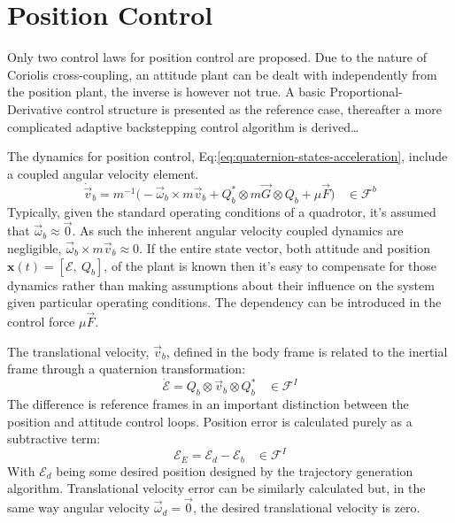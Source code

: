 {\section{Position Control}
\label{sec:control.position}
Only two control laws for position control are proposed. Due to the nature of Coriolis cross-coupling, an attitude plant can be dealt with independently from the position plant, the inverse is however not true. A basic Proportional-Derivative control structure is presented as the reference case, thereafter a more complicated adaptive backstepping control algorithm is derived\ldots
\par
The dynamics for position control, Eq:\ref{eq:quaternion-states-acceleration}, include a coupled angular velocity element.
\begin{equation}\label{eq:position-deriv}
\dot{\vec{v}}_b=m^{-1}\big(-\vec{\omega}_b\times m\vec{v}_b+Q_b^*\otimes m\vec{G}\otimes Q_b+\mu\vec{F}\big)~~~~\in\mathcal{F}^b
\end{equation}
Typically, given the standard operating conditions of a quadrotor, it's assumed that $\vec{\omega}_b\approx\vec{0}$. As such the inherent angular velocity coupled dynamics are negligible, $\vec{\omega}_b\times m\vec{v}_b\approx 0$. If the entire state vector, both attitude and position $\mathbf{x}(t)=[\mathcal{E},~Q_b]$, of the plant is known then it's easy to compensate for those dynamics rather than making assumptions about their influence on the system given particular operating conditions. The dependency can be introduced in the control force $\mu\vec{F}$. 
\par
The translational velocity, $\vec{v}_b$, defined in the body frame is related to the inertial frame through a quaternion transformation:
\begin{equation}
\dot{\mathcal{E}}=Q_b\otimes\vec{v}_b\otimes Q_b^*~~~~\in\mathcal{F}^I
\end{equation}
The difference is reference frames in an important distinction between the position and attitude control loops. Position error is calculated purely as a subtractive term:
\begin{equation}
\mathcal{E}_E=\mathcal{E}_d-\mathcal{E}_b~~~~\in\mathcal{F}^I
\end{equation}
With $\mathcal{E}_d$ being some desired position designed by the trajectory generation algorithm. Translational velocity error can be similarly calculated but, in the same way angular velocity $\vec{\omega}_d=\vec{0}$, the desired translational velocity is zero.
}
